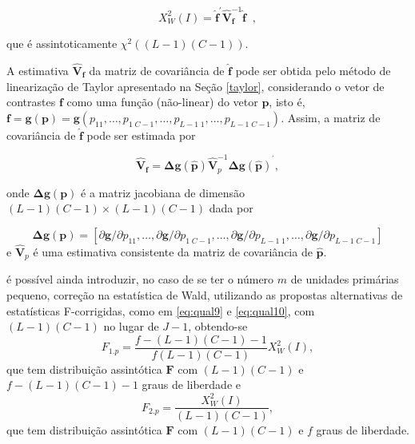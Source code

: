 \documentclass[]{book}
\numberwithin{example}{chapter}
\numberwithin{remark}{chapter}
\numberwithin{definition}{chapter}
\begin{document}
\begin{equation}
X_{W}^{2}\left( I\right) =\mathbf{\hat{f}}^{\prime }\mathbf{\hat{V}}_{
\mathbf{f}}^{-1}\mathbf{\hat{f}\;\;},  \label{eq:Tab10}
\end{equation}

que é assintoticamente
\(\chi ^{2}\left( \left( L-1\right) \left( C-1\right) \right)\).

A estimativa \(\mathbf{\hat{V}}_{\mathbf{f}}\) da matriz de covariância
de \(\mathbf{\hat{f}}\) pode ser obtida pelo método de linearização de
Taylor apresentado na Seção \ref{taylor}, considerando o vetor de
contrastes \(\mathbf{f}\) como uma função (não-linear) do vetor
\(\mathbf{p}\), isto é,
\(\mathbf{f=g}\left( \mathbf{p}\right) \mathbf{=g}\left( p_{11},\ldots ,p_{1\;C-1},\ldots ,p_{L-1\;1},\ldots,p_{L-1\;C-1}\right)\).
Assim, a matriz de covariância de \(\mathbf{\hat{f}}\) pode ser estimada
por

\begin{equation}
\mathbf{\hat{V}}_{\mathbf{f}}=\mathbf{\Delta g}\left( \mathbf{\hat{p}}
\right) \mathbf{\hat{V}}_{p}^{-1}\mathbf{\Delta g}\left( \mathbf{\hat{p}}
\right) ^{^{\prime }},  \label{eq:Tab11}
\end{equation}

onde \(\mathbf{\Delta g}\left( \mathbf{p}\right)\) é a matriz jacobiana
de dimensão
\(\left(L-1\right)\left( C-1\right)\times\left( L-1\right)\left( C-1\right)\)
dada por

\[
\mathbf{\Delta g}\left( \mathbf{p}\right) =\left[ \partial \mathbf{g}
/\partial p_{11},\ldots ,\partial \mathbf{g}/\partial p_{1\;C-1},\ldots
,\partial \mathbf{g}/\partial p_{L-1\;1},\ldots ,\partial \mathbf{g}
/\partial p_{L-1\;C-1}\right] 
\] e \(\mathbf{\hat{V}}_{p}\) é uma estimativa consistente da matriz de
covariância de \(\mathbf{\hat{p}}\).

é possível ainda introduzir, no caso de se ter o número \(m\) de
unidades primárias pequeno, correção na estatística de Wald, utilizando
as propostas alternativas de estatísticas F-corrigidas, como em
\eqref{eq:qual9} e \eqref{eq:qual10}, com
\(\left( L-1\right) \left( C-1\right)\) no lugar de \(J-1\), obtendo-se
\[
F_{1.p}=\frac{f-\left( L-1\right) \left( C-1\right) -1}{f\left( L-1\right)
\left( C-1\right) }X_{W}^{2}\left( I\right),
\] que tem distribuição assintótica \(\mathbf{F}\) com
\(\left(L-1\right) \left( C-1\right)\) e
\(f-\left( L-1\right) \left(C-1\right) -1\) graus de liberdade e \[
F_{2.p}=\frac{X_{W}^{2}\left( I\right) }{\left( L-1\right) \left( C-1\right) 
}, 
\] que tem distribuição assintótica \(\mathbf{F}\) com
\(\left(L-1\right) \left( C-1\right)\) e \(f\) graus de liberdade.
\end{document}
